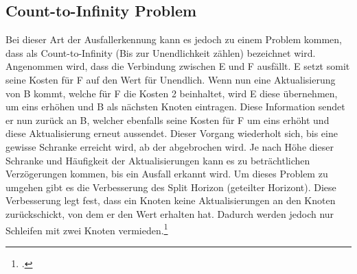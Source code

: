 \subsection{Count-to-Infinity Problem}
Bei dieser Art der Ausfallerkennung kann es jedoch zu einem Problem kommen, dass als Count-to-Infinity (Bis zur Unendlichkeit zählen) bezeichnet wird. Angenommen wird, dass die Verbindung zwischen E und F ausfällt. E setzt somit seine Kosten für F auf den Wert für Unendlich. Wenn nun eine Aktualisierung von B kommt, welche für F die Kosten 2 beinhaltet, wird E diese übernehmen, um eins erhöhen und B als nächsten Knoten eintragen. Diese Information sendet er nun zurück an B, welcher ebenfalls seine Kosten für F um eins erhöht und diese Aktualisierung erneut aussendet. Dieser Vorgang wiederholt sich, bis eine gewisse Schranke erreicht wird, ab der abgebrochen wird. Je nach Höhe dieser Schranke und Häufigkeit der Aktualisierungen kann es zu beträchtlichen Verzögerungen kommen, bis ein Ausfall erkannt wird. Um dieses Problem zu umgehen gibt es die Verbesserung des Split Horizon (geteilter Horizont). Diese Verbesserung legt fest, dass ein Knoten keine Aktualisierungen an den Knoten zurückschickt, von dem er den Wert erhalten hat. Dadurch werden jedoch nur Schleifen mit zwei Knoten vermieden.\footcite{distsys1}